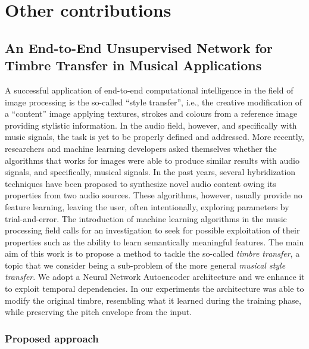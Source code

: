 \chapter{Other contributions}\label{ch:other}

\section{An End-to-End Unsupervised Network for Timbre Transfer in Musical Applications}

A successful application of end-to-end computational intelligence in the field of image processing is the so-called ``style transfer'', i.e., the creative modification of a ``content'' image applying textures, strokes and colours from a  reference image providing stylistic information. In the audio field, however, and specifically with music signals, the task is yet to be properly defined and addressed.
More recently, researchers and machine learning developers asked themselves whether the algorithms that works for images were able to produce similar results with audio signals, and specifically, musical signals.
In the past years, several hybridization techniques have been proposed to synthesize novel audio content owing its properties from two audio sources. These algorithms, however, usually provide no feature learning, leaving the user, often intentionally, exploring parameters by trial-and-error. The introduction of machine learning algorithms in the music processing field calls for an investigation to seek for possible exploitation of their properties such as the ability to learn semantically meaningful features. The main aim of this work is to propose a method to tackle the so-called \emph{timbre transfer}, a topic that we consider being a sub-problem of the more general \emph{musical style transfer}. We adopt a Neural Network Autoencoder architecture and we enhance it to exploit temporal dependencies. In our experiments the architecture was able to modify the original timbre, resembling what it learned during the training phase, while preserving the pitch envelope from the input.


\subsection{Proposed approach}
\label{sec:architecture}

